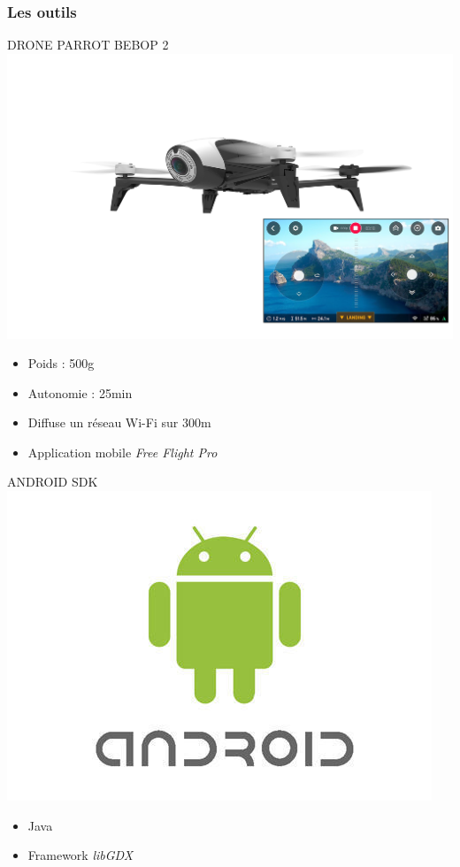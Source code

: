 \begin{frame}
\frametitle{Les outils}
\begin{minipage}[t]{.46\linewidth}
      \begin{center}
      DRONE PARROT BEBOP 2
      \includegraphics[scale=0.02]{images/drone.jpg}
      \begin{itemize}
      \item Poids : 500g
      \item Autonomie : 25min
      \item Diffuse un réseau Wi-Fi sur 300m
      \item Application mobile \textit{Free Flight Pro}
      \end{itemize}
      \end{center}
   \end{minipage} \hfill
   \begin{minipage}[t]{.46\linewidth}
      \begin{center}
      ANDROID SDK
      \includegraphics[scale=0.2]{images/android.jpg}
      \begin{itemize}
      \item Java
      \item Framework \textit{libGDX}
      \end{itemize}
      \end{center}
   \end{minipage}
\end{frame}